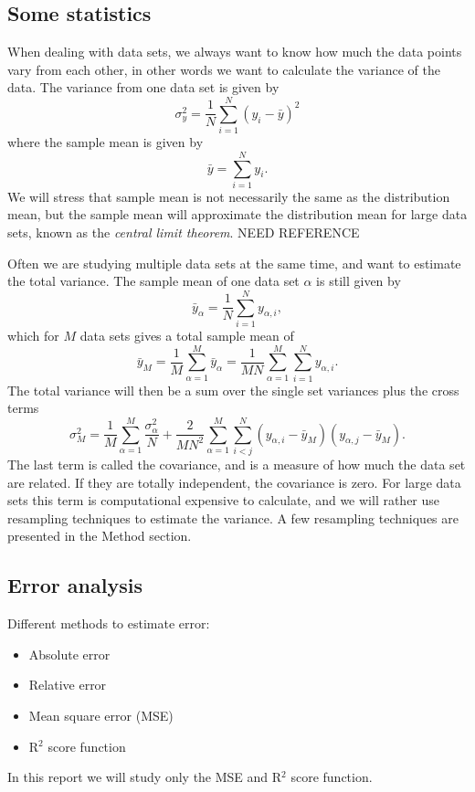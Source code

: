 \subsection{Some statistics} \label{sec:statistics}
When dealing with data sets, we always want to know how much the data points vary from each other, in other words we want to calculate the variance of the data. The variance from one data set is given by 
\begin{equation}
\sigma_y^2=\frac{1}{N}\sum_{i=1}^N(y_i-\bar{y})^2
\end{equation}
where the sample mean is given by
\begin{equation}
\bar{y}=\sum_{i=1}^Ny_i.
\end{equation}
We will stress that sample mean is not necessarily the same as the distribution mean, but the sample mean will approximate the distribution mean for large data sets, known as the \textit{central limit theorem}. NEED REFERENCE

Often we are studying multiple data sets at the same time, and want to estimate the total variance. The sample mean of one data set $\alpha$ is still given by
\begin{equation}
\bar{y}_{\alpha}=\frac{1}{N}\sum_{i=1}^Ny_{\alpha,i},
\end{equation}
which for $M$ data sets gives a total sample mean of
\begin{equation}
\bar{y}_M=\frac{1}{M}\sum_{\alpha=1}^M\bar{y}_{\alpha}=\frac{1}{MN}\sum_{\alpha=1}^M\sum_{i=1}^Ny_{\alpha,i}.
\end{equation}
The total variance will then be a sum over the single set variances plus the cross terms
\begin{equation}
\sigma_M^2=\frac{1}{M}\sum_{\alpha=1}^M\frac{\sigma_{\alpha}^2}{N}+\frac{2}{MN^2}\sum_{\alpha=1}^M\sum_{i<j}^N(y_{\alpha,i}-\bar{y}_M)(y_{\alpha,j}-\bar{y}_M).
\end{equation}
The last term is called the covariance, and is a measure of how much the data set are related. If they are totally independent, the covariance is zero. For large data sets this term is computational expensive to calculate, and we will rather use resampling techniques to estimate the variance. A few resampling techniques are presented in the Method section.

\subsection{Error analysis} \label{sec:error_analysis}
Different methods to estimate error:
\begin{itemize}
	\item{Absolute error}
	\item{Relative error}
	\item{Mean square error (MSE)}
	\item{R$^2$ score function}
\end{itemize}
In this report we will study only the MSE and R$^2$ score function.

